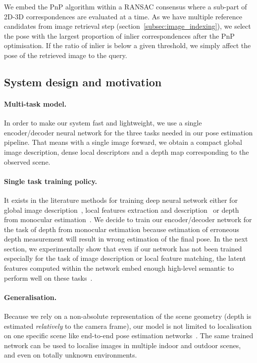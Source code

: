 We embed the PnP algorithm within a RANSAC consensus where a sub-part of 2D-3D correspondences are evaluated at a time. As we have multiple reference candidates from image retrieval step (section~\ref{subsec:image_indexing}), we select the pose with the largest proportion of inlier correspondences after the PnP optimisation. If the ratio of inlier is below a given threshold, we simply affect the pose of the retrieved image to the query.

\subsection{System design and motivation}
\paragraph{Multi-task model.} In order to make our system fast and lightweight, we use a single encoder/decoder neural network for the three tasks needed in our pose estimation pipeline. That means with a single image forward, we obtain a compact global image description, dense local descriptors and a depth map corresponding to the observed scene.
\paragraph{Single task training policy.} It exists in the literature methods for training deep neural network either for global image description~\citep{Arandjelovic2017, Radenovic2017, Gordo2017}, local features extraction and description~\citep{Yi2016a, Rocco2018, Ono2018} or depth from monocular estimation~\citep{Eigen2014, Godard2017, Mahjourian2018}. We decide to train our encoder/decoder network for the task of depth from monocular estimation because estimation of erroneous depth measurement will result in wrong estimation of the final pose. In the next section, we experimentally show that even if our network has not been trained especially for the task of image description or local feature matching, the latent features computed within the network embed enough high-level semantic to perform well on these tasks~\citep{Taira2018, Zamir2018}.
\paragraph{Generalisation.} Because we rely on a non-absolute representation of the scene geometry (depth is estimated \textit{relatively} to the camera frame), our model is not limited to localisation on one specific scene like end-to-end pose estimation networks~\citep{Kendall2017, Brachmann2017b}. The same trained network can be used to localise images in multiple indoor and outdoor scenes, and even on totally unknown environments. 